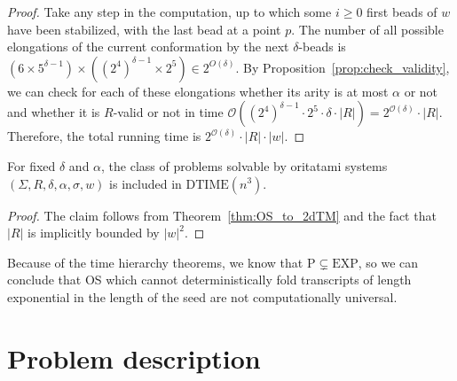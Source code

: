 \documentclass[runningheads]{llncs}
\begin{document}
\begin{proof}
	Take any step in the computation, up to which some $i \ge 0$ first beads of $w$ have been stabilized, with the last bead at a point $p$. 
	The number of all possible elongations of the current conformation by the next $\delta$-beads is $(6 \times 5^{\delta-1}) \times ((2^4)^{\delta-1} \times 2^5) \in 2^{O(\delta)}$. 
	By Proposition~\ref{prop:check_validity}, we can check for each of these elongations whether its arity is at most $\alpha$ or not and whether it is $R$-valid or not in time $\mathcal{O}((2^4)^{\delta-1}\cdot2^5\cdot \delta\cdot|R|)=2^{\mathcal{O}(\delta)}\cdot|R|$.  Therefore, the total running time is $2^{\mathcal{O}(\delta)}\cdot |R|\cdot|w|$.
\end{proof}

\begin{corollary}
	For fixed $\delta$ and $\alpha$, the class of problems solvable by oritatami systems $(\Sigma, R, \delta, \alpha, \sigma, w)$ is included in $\mathrm{DTIME}(n^3)$.
\end{corollary}
\begin{proof}
	The claim follows from Theorem~\ref{thm:OS_to_2dTM} and the fact that $|R|$ is implicitly bounded by $|w|^2$.
\end{proof}



Because of the time hierarchy theorems, we know that $\mathrm{P}\subsetneq \mathrm{EXP}$, so we can conclude that OS which cannot deterministically fold transcripts of length exponential in the length of the seed are not computationally universal.

	\section{Problem description}
\end{document}
